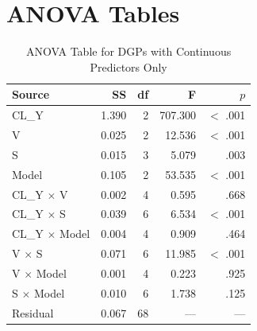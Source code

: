 \documentclass[12pt]{article}
\begin{document}
\newpage
\section{ANOVA Tables}
\label{app:anova_tables}

\begin{table}[h]
    \centering
    \caption{ANOVA Table for DGPs with Continuous Predictors Only}
    \label{tab:anova_cont}
    \vspace{0.2cm}
    \begin{tabular}{lrrrr}
        \toprule
        Source & SS & df & F & $p$ \\
        \midrule
        CL\_Y           & 1.390  & 2  & 707.300  & $<$ .001 \\
        V              & 0.025  & 2  & 12.536   & $<$ .001 \\
        S              & 0.015  & 3  & 5.079    & .003  \\
        Model          & 0.105  & 2  & 53.535   & $<$ .001 \\
        CL\_Y $\times$ V      & 0.002  & 4  & 0.595    & .668  \\
        CL\_Y $\times$ S      & 0.039  & 6  & 6.534    & $<$ .001 \\
        CL\_Y $\times$ Model  & 0.004  & 4  & 0.909    & .464  \\
        V $\times$ S         & 0.071  & 6  & 11.985   & $<$ .001 \\
        V $\times$ Model     & 0.001  & 4  & 0.223    & .925  \\
        S $\times$ Model     & 0.010  & 6  & 1.738    & .125  \\
        Residual       & 0.067  & 68 & ---       & ---    \\
        \bottomrule
    \end{tabular}
\end{table}
\end{document}
